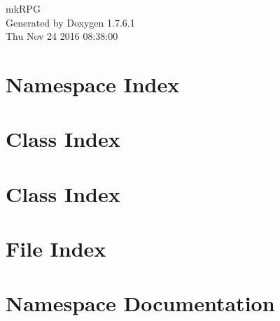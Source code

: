 \documentclass[a4paper]{book}
\begin{document}
\hypersetup{pageanchor=false,citecolor=blue}
\begin{titlepage}
\vspace*{7cm}
\begin{center}
{\Large mk\-R\-P\-G }\\
\vspace*{1cm}
{\large \-Generated by Doxygen 1.7.6.1}\\
\vspace*{0.5cm}
{\small Thu Nov 24 2016 08:38:00}\\
\end{center}
\end{titlepage}
\clearemptydoublepage
{}
\tableofcontents
\clearemptydoublepage
{}
\hypersetup{pageanchor=true,citecolor=blue}
\chapter{\-Namespace \-Index}

\chapter{\-Class \-Index}

\chapter{\-Class \-Index}

\chapter{\-File \-Index}

\chapter{\-Namespace \-Documentation}









\end{document}
